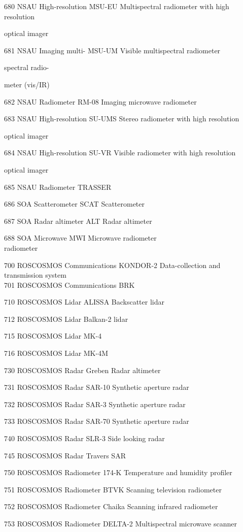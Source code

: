 680 NSAU High-resolution MSU-EU Multispectral radiometer with high resolution

optical imager

681 NSAU Imaging multi- MSU-UM Visible multispectral radiometer

spectral radio-

meter (vis/IR)

682 NSAU Radiometer RM-08 Imaging microwave radiometer

683 NSAU High-resolution SU-UMS Stereo radiometer with high resolution

optical imager

684 NSAU High-resolution SU-VR Visible radiometer with high resolution

optical imager

685 NSAU Radiometer TRASSER

686 SOA Scatterometer SCAT Scatterometer

687 SOA Radar altimeter ALT Radar altimeter

688 SOA Microwave MWI Microwave radiometer\\
radiometer

700 ROSCOSMOS Communications KONDOR-2 Data-collection and transmission system\\
701 ROSCOSMOS Communications BRK

710 ROSCOSMOS Lidar ALISSA Backscatter lidar

712 ROSCOSMOS Lidar Balkan-2 lidar

715 ROSCOSMOS Lidar MK-4

716 ROSCOSMOS Lidar MK-4M

730 ROSCOSMOS Radar Greben Radar altimeter

731 ROSCOSMOS Radar SAR-10 Synthetic aperture radar

732 ROSCOSMOS Radar SAR-3 Synthetic aperture radar

733 ROSCOSMOS Radar SAR-70 Synthetic aperture radar

740 ROSCOSMOS Radar SLR-3 Side looking radar

745 ROSCOSMOS Radar Travers SAR

750 ROSCOSMOS Radiometer 174-K Temperature and humidity profiler

751 ROSCOSMOS Radiometer BTVK Scanning television radiometer

752 ROSCOSMOS Radiometer Chaika Scanning infrared radiometer

753 ROSCOSMOS Radiometer DELTA-2 Multispectral microwave scanner

